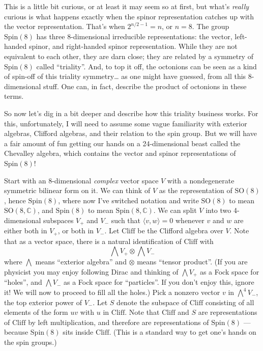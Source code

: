 \documentclass{article}
\begin{document}
This is a little bit curious, or at least it may seem so at first, but
what's \emph{really} curious is what happens exactly when the spinor
representation catches up with the vector representation. That's when
\(2^{n/2-1} = n\), or \(n = 8\). The group \(\mathrm{Spin}(8)\) has
three 8-dimensional irreducible representations: the vector, left-handed
spinor, and right-handed spinor representation. While they are not
equivalent to each other, they are darn close; they are related by a
symmetry of \(\mathrm{Spin}(8)\) called ``triality''. And, to top it
off, the octonions can be seen as a kind of spin-off of this triality
symmetry\ldots{} as one might have guessed, from all this 8-dimensional
stuff. One can, in fact, describe the product of octonions in these
terms.

So now let's dig in a bit deeper and describe how this triality business
works. For this, unfortunately, I will need to assume some vague
familiarity with exterior algebras, Clifford algebras, and their
relation to the spin group. But we will have a fair amount of fun
getting our hands on a 24-dimensional beast called the Chevalley
algebra, which contains the vector and spinor representations of
\(\mathrm{Spin}(8)\)!

Start with an 8-dimensional \emph{complex} vector space \(V\) with a
nondegenerate symmetric bilinear form on it. We can think of \(V\) as
the representation of \(\mathrm{SO}(8)\), hence \(\mathrm{Spin}(8)\),
where now I've switched notation and write \(\mathrm{SO}(8)\) to mean
\(\mathrm{SO}(8,\mathbb{C})\), and \(\mathrm{Spin}(8)\) to mean
\(\mathrm{Spin}(8,\mathbb{C})\). We can split \(V\) into two
4-dimensional subspaces \(V_+\) and \(V_-\) such that
\(\langle v,w\rangle = 0\) whenever \(v\) and \(w\) are either both in
\(V_+\), or both in \(V_-\). Let \(\mathrm{Cliff}\) be the Clifford
algebra over \(V\). Note that as a vector space, there is a natural
identification of \(\mathrm{Cliff}\) with
\[\bigwedge V_+ \otimes \bigwedge V_-\] where \(\bigwedge\) means
``exterior algebra'' and \(\otimes\) means ``tensor product''. (If you
are physicist you may enjoy following Dirac and thinking of
\(\bigwedge V_+\) as a Fock space for ``holes'', and \(\bigwedge V_-\)
as a Fock space for ``particles''. If you don't enjoy this, ignore it!
We will now to proceed to fill all the holes.) Pick a nonzero vector
\(v\) in \(\bigwedge^4 V_-\), the top exterior power of \(V_-\). Let
\(S\) denote the subspace of \(\mathrm{Cliff}\) consisting of all
elements of the form \(uv\) with \(u\) in \(\mathrm{Cliff}\). Note that
\(\mathrm{Cliff}\) and \(S\) are representations of \(\mathrm{Cliff}\)
by left multiplication, and therefore are representations of
\(\mathrm{Spin}(8)\) --- because \(\mathrm{Spin}(8)\) sits inside
\(\mathrm{Cliff}\). (This is a standard way to get one's hands on the
spin groups.)
\end{document}
